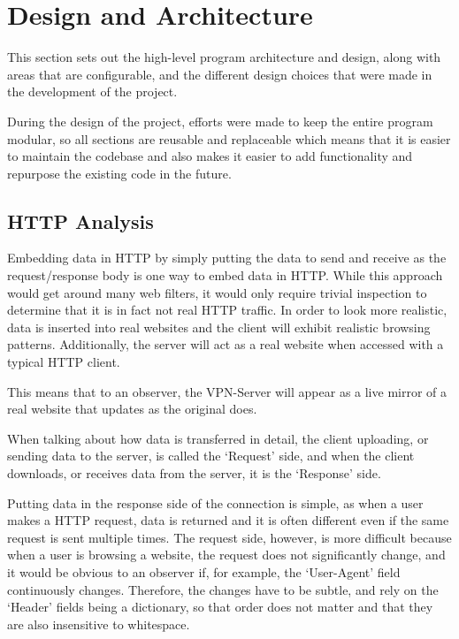\section{Design and Architecture}
This section sets out the high-level program architecture and design, along with areas that are configurable, and the different design choices that were made in the development of the project.

During the design of the project, efforts were made to keep the entire program modular, so all sections are reusable and replaceable which means that it is easier to maintain the codebase and also makes it easier to add functionality and repurpose the existing code in the future.
\subsection{HTTP Analysis}
Embedding data in HTTP by simply putting the data to send and receive as the request/response body is one way to embed data in HTTP\@. While this approach would get around many web filters, it would only require trivial inspection to determine that it is in fact not real HTTP traffic.
In order to look more realistic, data is inserted into real websites and the client will exhibit realistic browsing patterns. Additionally, the server will act as a real website when accessed with a typical HTTP client.

This means that to an observer, the VPN-Server will appear as a live mirror of a real website that updates as the original does.

When talking about how data is transferred in detail, the client uploading, or sending data to the server, is called the `Request' side, and when the client downloads, or receives data from the server, it is the `Response' side.

Putting data in the response side of the connection is simple, as when a user makes a HTTP request, data is returned and it is often different even if the same request is sent multiple times.
The request side, however, is more difficult because when a user is browsing a website, the request does not significantly change, and it would be obvious to an observer if, for example, the `User-Agent' field continuously changes. Therefore, the changes have to be subtle, and rely on the `Header' fields being a dictionary, so that order does not matter and that they are also insensitive to whitespace.

\newpage

